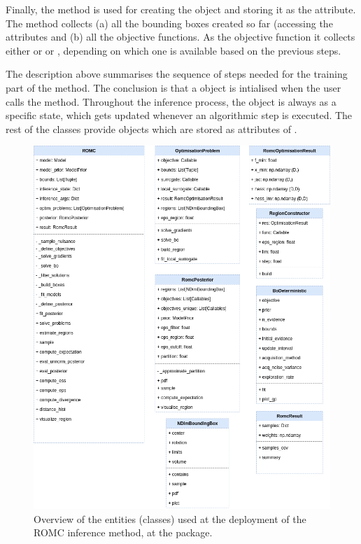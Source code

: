 Finally, the  method is used for creating
the  object and storing it as the
 attribute. The method collects (a) all the
bounding boxes created so far (accessing the
 attributes and (b) all the objective functions. As the objective function it collects either  or \linebreak {} or , depending on which one is available based on the previous steps.

The description above summarises the sequence of steps needed for the
training part of the method. The conclusion is that a 
object is intialised when the user calls the method. Throughout the
inference process, the  object is always as a specific state,
which gets updated whenever an algorithmic step is executed. The rest
of the classes provide objects which are stored as attributes of
.

\begin{figure}[ht]
    \begin{center}
      \includegraphics[width=\textwidth]{./Thesis/graphs/RomcEntityDiagram.png}
    \end{center}
  \caption[Overview of the entities (classes) of the ROMC implementation.]{Overview of the entities (classes) used at the deployment of the ROMC inference method, at the  package.}
  \label{fig:example_training}
\end{figure}


